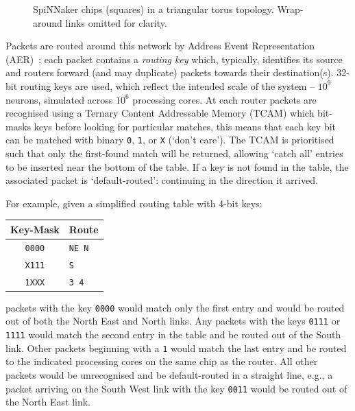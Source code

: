 \documentclass[conference]{IEEEtran}
\newcommand{\mytt}[1]{\texttt{\footnotesize#1}}
\begin{document}
\begin{figure}[!b]
  
  \center
  
  
  \caption{SpiNNaker chips (squares) in a triangular torus topology. Wrap-around links omitted for clarity.}
  \label{fig:diagrams/topology}
  
\end{figure}

Packets are routed around this network by Address Event Representation (AER)~\parencite{Boahen2000}; each packet contains a \emph{routing key} which, typically, identifies its source and routers forward (and may duplicate) packets towards their destination(s).
32-bit routing keys are used, which reflect the intended scale of the system -- $10^9$ neurons, simulated across $10^6$ processing cores.
At each router packets are recognised using a Ternary Content Addressable Memory (TCAM) which bit-masks keys before looking for particular matches,
this means that each key bit can be matched with binary \mytt{0}, \mytt{1}, or \mytt{X} (`don't care').
The TCAM is prioritised such that only the first-found match will be returned, allowing `catch all' entries to be inserted near the bottom of the table.
If a key is not found in the table, the associated packet is `default-routed': continuing in the direction it arrived.

For example, given a simplified routing table with 4-bit keys:

\begin{table}[H]
  \centering
  \begin{tabular}{c l}
    \toprule
    Key-Mask & Route \\
    \midrule
    \texttt{0000} & \texttt{NE N}\\
    \texttt{X111} & \texttt{S}\\
    \texttt{1XXX} & \texttt{3 4}\\
    \bottomrule
  \end{tabular}
\end{table}

\noindent packets with the key \mytt{0000} would match only the first entry and would be routed out of both the North East and North links.
Any packets with the keys \mytt{0111} or \mytt{1111} would match the second entry in the table and be routed out of the South link.
Other packets beginning with a \mytt{1} would match the last entry and be routed to the indicated processing cores on the same chip as the router.
All other packets would be unrecognised and be default-routed in a straight line, e.g., a packet arriving on the South West link with the key \mytt{0011} would be routed out of the North East link.
\end{document}
